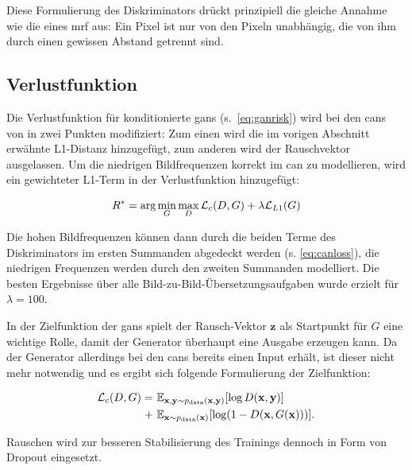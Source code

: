 Diese Formulierung des Diskriminators drückt prinzipiell die gleiche Annahme wie die eines \gls{mrf} aus:
Ein Pixel ist nur von den Pixeln unabhängig, die von ihm durch einen gewissen Abstand getrennt sind.



\subsection{Verlustfunktion}

Die Verlustfunktion für konditionierte \glspl{gan} (s.~\autoref{eq:ganrisk}) wird bei den \glspl{can} von \citeauthor{Isola.2017} in zwei Punkten modifiziert:
Zum einen wird die im vorigen Abschnitt erwähnte L1-Distanz hinzugefügt, zum anderen wird der Rauschvektor ausgelassen.
Um die niedrigen Bildfrequenzen korrekt im \gls{can} zu modellieren, wird ein gewichteter L1-Term in der Verlustfunktion hinzugefügt:

\begin{equation}
R^* = \textup{arg}\min_G \max_D \mathcal{L}_c(D, G) + \lambda \mathcal{L}_{L1}(G)
\end{equation}

Die hohen Bildfrequenzen können dann durch die beiden Terme des Diskriminators im ersten Summanden abgedeckt werden (s. \autoref{eq:canloss}), die niedrigen Frequenzen werden durch den zweiten Summanden modelliert.
Die besten Ergebnisse über alle Bild-zu-Bild-Übersetzungsaufgaben wurde erzielt für $ \lambda = 100 $.

In der Zielfunktion der \glspl{gan} spielt der Rausch-Vektor $ \mathbf{z} $ als Startpunkt für $ G $ eine wichtige Rolle, damit der Generator überhaupt eine Ausgabe erzeugen kann.
Da der Generator allerdings bei den \glspl{can} bereits einen Input erhält, ist dieser nicht mehr notwendig und es ergibt sich folgende Formulierung der Zielfunktion:

\begin{equation}\label{eq:canlosswonoise}
\begin{split}
\mathcal{L}_c(D, G) = & \ \mathbb{E}_{\mathbf{x}, \mathbf{y} \sim p_{\textup{data}}(\mathbf{x}, \mathbf{y})} [\log D(\mathbf{x}, \mathbf{y})] \\
+ & \ \mathbb{E}_{\mathbf{x} \sim p_{\textup{data}}(\mathbf{x})} [\log(1 - D(\mathbf{x}, G(\mathbf{x})))].
\end{split}
\end{equation}

Rauschen wird zur besseren Stabilisierung des Trainings dennoch in Form von Dropout eingesetzt.

